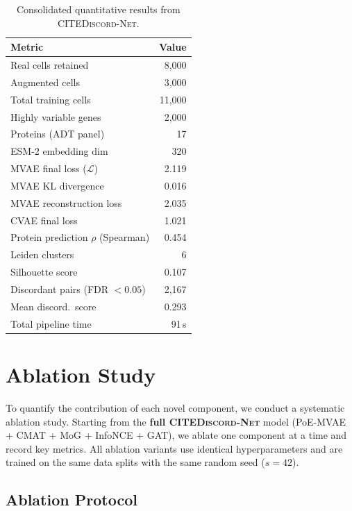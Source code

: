 \documentclass[11pt,a4paper]{article}
\newcommand{\citenet}{\textsc{CITEDiscord-Net}}
\begin{document}
\begin{table}[!ht]
\centering
\caption{Consolidated quantitative results from \citenet{}.}
\label{tab:summary}
\scriptsize
\begin{tabular}{lr}
\toprule
\textbf{Metric} & \textbf{Value} \\
\midrule
Real cells retained      & 8{,}000 \\
Augmented cells          & 3{,}000 \\
Total training cells     & 11{,}000 \\
Highly variable genes    & 2{,}000 \\
Proteins (ADT panel)     & 17 \\
ESM-2 embedding dim      & 320 \\
\midrule
MVAE final loss ($\mathcal{L}$) & 2.119 \\
MVAE KL divergence       & 0.016 \\
MVAE reconstruction loss & 2.035 \\
CVAE final loss          & 1.021 \\
\midrule
Protein prediction $\rho$ (Spearman) & 0.454 \\
Leiden clusters          & 6 \\
Silhouette score         & 0.107 \\
\midrule
Discordant pairs (FDR $<0.05$) & 2{,}167 \\
Mean discord.\ score     & 0.293 \\
\midrule
Total pipeline time      & 91\,s \\
\bottomrule
\end{tabular}
\end{table}

\section{Ablation Study}\label{sec:ablation}

To quantify the contribution of each novel component, we conduct a systematic ablation study.
Starting from the \textbf{full \citenet{}} model (PoE-MVAE + CMAT + MoG + InfoNCE + GAT), we ablate one component at a time and record key metrics.
All ablation variants use identical hyperparameters and are trained on the same data splits with the same random seed ($s=42$).

\subsection{Ablation Protocol}
\end{document}
